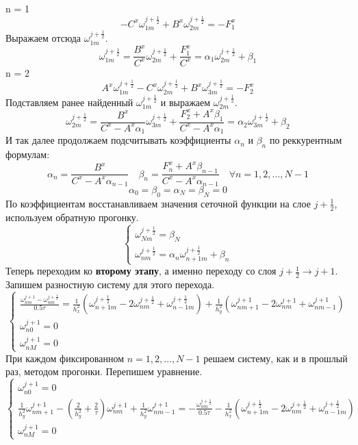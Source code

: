 \documentclass{article}
\begin{document}
n = 1
$$
-C^x\omega_{1m}^{j+\frac{1}{2}} + B^x \omega_{2m}^{j+\frac{1}{2}} = - F_1^x 
$$
Выражаем отсюда $\omega_{1m}^{j+\frac{1}{2}}$.
$$
\omega_{1m}^{j+\frac{1}{2}}  = \frac{B^x}{C^x} \omega_{2m}^{j+\frac{1}{2}} + \frac{F_1^x}{C^x} =  \alpha_1 \omega_{2m}^{j+\frac{1}{2}} + \beta_1
$$
n = 2
$$
A^x\omega_{1m}^{j+\frac{1}{2}} -C^x\omega_{2m}^{j+\frac{1}{2}} + B^x \omega_{3m}^{j+\frac{1}{2}} = - F_2^x 
$$
Подставляем ранее найденный $\omega_{1m}^{j+\frac{1}{2}}$ и выражаем $\omega_{2m}^{j+\frac{1}{2}}$.
$$
\omega_{2m}^{j+\frac{1}{2}} = \frac{B^x}{C^x - A^x\alpha_1} \omega_{3m}^{j+\frac{1}{2}} + \frac{F^x_2 + A^x\beta_1}{C^x - A^x\alpha_1} = \alpha_2 \omega_{3m}^{j+\frac{1}{2}} + \beta_2
$$
И так далее продолжаем подсчитывать коэффициенты $\alpha_n$ и $\beta_n$ по реккурентным формулам:
$$
\alpha_n = \frac{B^x}{C^x - A^x\alpha_{n-1}}\quad\beta_n = \frac{F_n^x + A^x \beta_{n-1}}{C^x - A^x\alpha_{n-1}}\quad \forall n = 1,2,...,N-1
$$
$$
\alpha_0 = \beta_0 = \alpha_N = \beta_N =0
$$
По коэффициентам восстанавливаем значения сеточной функции на слое $j + \frac{1}{2}$, используем обратную прогонку. 
\begin{equation}
\begin{cases}
\omega_{Nm}^{j+\frac{1}{2}} = \beta_N\\
\omega_{nm}^{j+\frac{1}{2}} = \alpha_n \omega_{n+1m}^{j+\frac{1}{2}} + \beta_n
\end{cases}
\end{equation}
Теперь переходим ко \textbf{второму этапу}, а именно переходу со слоя $j+\frac{1}{2} \rightarrow j+1$. Запишем разностную систему для этого перехода.
\begin{equation}
    \begin{cases}
    \frac{\omega_{nm}^{j+1} - \omega_{nm}^{j+\frac{1}{2}}}{0.5\tau} = \frac{1}{h_x^2}\left(\omega_{n+1 m }^{j+\frac{1}{2}} - 2\omega_{n m }^{j+\frac{1}{2}} + \omega_{n-1 m }^{j+\frac{1}{2}}   \right) + \frac{1}{h_y^2}\left(\omega_{n m+1 }^{j+1} - 2\omega_{n m }^{j+1} + \omega_{n m-1 }^{j+1}   \right)
    \\
    \omega_{n0}^{j+1} = 0
    \\
    \omega_{nM}^{j+1} = 0
    \end{cases}
\end{equation}
При каждом фиксированном $n = 1,2,...,N-1$ решаем систему, как и в прошлый раз, методом прогонки. Перепишем уравнение.
\begin{equation}
    \begin{cases}
    \omega_{n0}^{j+1} = 0
    \\
    \frac{1}{h_y^2} \omega_{n m+1 }^{j+1} - (\frac{2}{h_y^2} + \frac{2}{\tau})\omega_{n m }^{j+1} + \frac{1}{h_y^2}\omega_{n m-1 }^{j+1} = - \frac{\omega_{n m }^{j+\frac{1}{2}}}{0.5\tau} - \frac{1}{h_x^2}\left(\omega_{n+1 m }^{j+\frac{1}{2}} - 2\omega_{n m }^{j+\frac{1}{2}} + \omega_{n-1 m }^{j+\frac{1}{2}}   \right)
    \\
    \omega_{nM}^{j+1} = 0
    \end{cases}
\end{equation}
\end{document}
